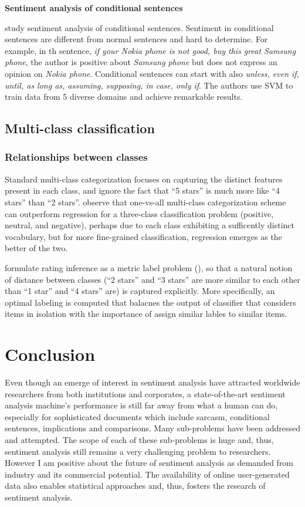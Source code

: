 \documentclass{article}
\begin{document}
\begin{multicols}{2}
       \textbf{Sentiment analysis of conditional sentences}

        \citet{Narayanan2009} study sentiment analysis of conditional sentences.
Sentiment in conditional sentences are different from normal sentences and hard
to determine. For example, in th sentence, \textit{if your Nokia phone is not
good, buy this great Samsung phone}, the author is positive about \textit{
Samsung phone} but does not express an opinion on \textit{Nokia phone}.
Conditional sentences can start with also \textit{unless, even if, until, as long
as, assuming, supposing, in case, only if}. The authors use SVM to train data
from 5 diverse domains and achieve remarkable results.


  \subsection{Multi-class classification}
    \subsubsection{Relationships between classes}
        Standard multi-class categorization focuses on capturing the
distinct features present in each class, and ignore the fact that ``5 stars'' is
much more like ``4 stars'' than ``2 stars''. \cite{Pang2005} observe that
one-vs-all multi-class categorization scheme can outperform regression for a
three-class classification problem (positive, neutral, and negative), perhaps
due to each class exhibiting a sufficently distinct vocabulary, but for more
fine-grained classification, regression emerges as the better of the two.
        
        \cite{Pang2005} formulate rating inference as a metric label
problem (\cite{Kleinberg2002}), so that a natural notion of distance between
classes (``2 stars'' and ``3 stars'' are more similar to each other than ``1
star'' and ``4 stars'' are) is captured explicitly. More specifically, an
optimal labeling is computed that balacnes the output of classifier that
considers items in isolation with the importance of assign similar lables to
similar items.

\section{Conclusion}
    Even though an emerge of interest in sentiment analysis have attracted 
worldwide researchers from both institutions and corporates, a state-of-the-art
sentiment analysis machine's performance is still far away from what a human can
do, especially for sophisticated documents which include sarcasm, conditional
sentences, implications and comparisons. Many sub-problems have been addressed
and attempted. The scope of each of these sub-problems is huge and, thus, 
sentiment analysis still remains a very challenging problem to researchers.
However I am positive about the future of sentiment analysis as demanded from
industry and its commercial potential. The availability of online user-generated 
data also enables statistical approaches and, thus, fosters the research 
of sentiment analysis.




\end{multicols}
\end{document}
